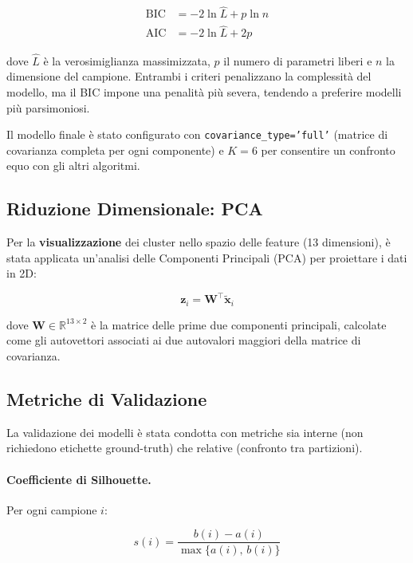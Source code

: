 \documentclass[a4paper,12pt]{article}
\begin{document}
\begin{align}
    \text{BIC} &= -2 \ln \hat{L} + p \ln n \\
    \text{AIC} &= -2 \ln \hat{L} + 2p
\end{align}

dove $\hat{L}$ è la verosimiglianza massimizzata, $p$ il numero di
parametri liberi e $n$ la dimensione del campione. Entrambi i criteri
penalizzano la complessità del modello, ma il BIC impone una penalità
più severa, tendendo a preferire modelli più parsimoniosi.

Il modello finale è stato configurato con \texttt{covariance\_type='full'}
(matrice di covarianza completa per ogni componente) e $K=6$ per
consentire un confronto equo con gli altri algoritmi.

\subsection{Riduzione Dimensionale: PCA}

Per la \textbf{visualizzazione} dei cluster nello spazio delle feature
(13 dimensioni), è stata applicata un'analisi delle Componenti
Principali (PCA) per proiettare i dati in 2D:

\begin{equation}
    \mathbf{z}_i = \mathbf{W}^\top \tilde{\mathbf{x}}_i
\end{equation}

dove $\mathbf{W} \in \mathbb{R}^{13 \times 2}$ è la matrice delle prime
due componenti principali, calcolate come gli autovettori associati ai
due autovalori maggiori della matrice di covarianza.

\subsection{Metriche di Validazione}
\label{subsec:metriche}

La validazione dei modelli è stata condotta con metriche sia interne
(non richiedono etichette ground-truth) che relative (confronto tra
partizioni).

\paragraph{Coefficiente di Silhouette.} Per ogni campione $i$:

\begin{equation}
    s(i) = \frac{b(i) - a(i)}{\max\{a(i),\, b(i)\}}
\end{equation}
\end{document}

